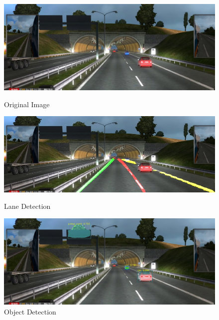 \documentclass[runningheads]{llncs}
\begin{document}
\begin{figure}[!htb]
	\includegraphics[width=\linewidth]{result/w000106.jpg}
	\caption{Original Image}\label{fig:Original_Image}
	\endminipage\hfill
	\includegraphics[width=\linewidth]{result/w000106-lane.jpg}
	\caption{Lane Detection}\label{fig:Lane_Line_Result}
	\endminipage\hfill
	\includegraphics[width=\linewidth]{result/w000106-obj.jpg}
	\caption{Object Detection}\label{fig:Object_result}
	\endminipage
\end{figure}
\end{document}
